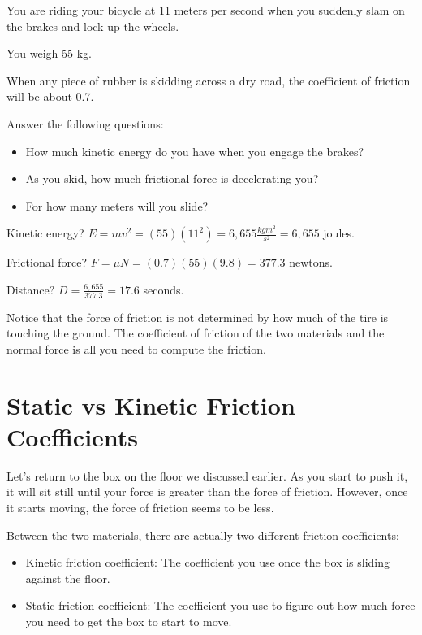 \begin{Exercise}[title={Bicycle Stopping},  label=bike_stop]
  
You are riding your bicycle at 11 meters per second when you suddenly slam on the brakes and lock up the wheels.  

You weigh 55 kg.   

When any piece of rubber is skidding across a dry road, the coefficient of friction will be about 0.7.

Answer the following questions: 

\begin{itemize}
\item How much kinetic energy do you have when you engage the brakes?
\item As you skid,  how much frictional force is decelerating you?
\item For how many meters will you slide?
\end{itemize}

\end{Exercise}
\begin{Answer}[ref=bike_stop]

Kinetic energy? $E = mv^2 = (55)(11^2) = 6,655 \frac{kg m^2}{s^2} = 6,655$ joules.

Frictional force? $F = \mu N = (0.7)(55)(9.8) = 377.3$ newtons.

Distance?  $D = \frac{6,655}{377.3} = 17.6$ seconds.

\end{Answer}

Notice that the force of friction is not determined by how much of the tire is touching the ground. The coefficient of friction of the two materials and the normal force is all you need to compute the friction.

\section{Static vs Kinetic Friction Coefficients}

Let's return to the box on the floor we discussed earlier. As you start to push it, it will sit still until your force is greater than the force of friction.   However, once it starts moving,  the force of friction seems to be less.

Between the two materials,  there are actually two different friction coefficients:

\begin{itemize}
\item Kinetic friction coefficient: The coefficient you use once the box is sliding against the floor.
\item Static friction coefficient: The coefficient you use to figure out how much force you need to get the box to start to move.
\end{itemize}

